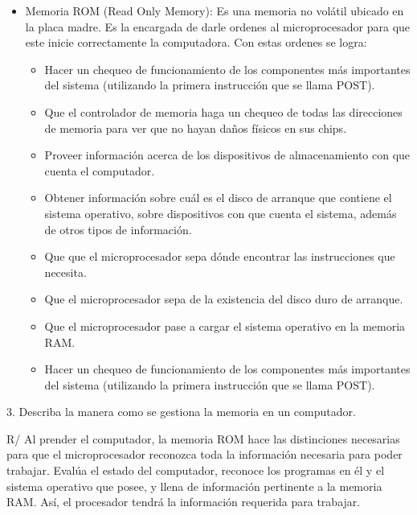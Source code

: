 \documentclass{article}
\begin{document}
\begin{itemize}
    \item Memoria ROM (Read Only Memory):
    Es una memoria no volátil ubicado en la placa madre.
    Es la encargada de darle ordenes al microprocesador para que este inicie correctamente la computadora.
    Con estas ordenes se logra: 
        \begin{itemize}
        \item
            Hacer un chequeo de funcionamiento de los componentes más importantes del sistema (utilizando la primera instrucción que se llama POST).
        \item 
            Que el controlador de memoria haga un chequeo de todas las direcciones de memoria para ver que no hayan daños físicos en sus chips. 
        \item 
            Proveer información acerca de los dispositivos de almacenamiento con que cuenta el computador.
        \item 
            Obtener información sobre cuál es el disco de arranque que contiene el sistema operativo, sobre dispositivos con que cuenta el sistema, además de otros tipos de información.
        \item
            Que que el microprocesador sepa dónde encontrar las instrucciones que necesita.
        \item
            Que el microprocesador sepa de la existencia del disco duro de arranque.
        \item
            Que el microprocesador pase a cargar el sistema operativo en la memoria RAM.
        \item
            Hacer un chequeo de funcionamiento de los componentes más importantes del sistema (utilizando la primera instrucción que se llama POST).
    \end{itemize}


\end{itemize}




\vspace{0.5cm}

\vspace{0.5cm}
3. Describa la manera como se gestiona la memoria en un computador.

R/ Al prender el computador, la memoria ROM hace las distinciones necesarias para que el microprocesador reconozca toda la información necesaria para poder trabajar. Evalúa el estado del computador, reconoce los programas en él y el sistema operativo que posee, y llena de información pertinente a la memoria RAM. Así, el procesador tendrá la información requerida para trabajar.
\end{document}
